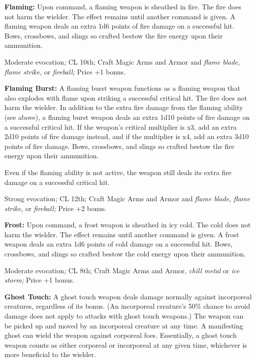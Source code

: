 \textbf{Flaming: }Upon command, a flaming weapon is sheathed in fire. The fire 
does not harm the wielder. The effect remains until another command is given. A 
flaming weapon deals an extra 1d6 points of fire damage on a successful hit. Bows, 
crossbows, and slings so crafted bestow the fire energy upon their ammunition.

Moderate evocation\textit{; }CL 10th; Craft Magic Arms and Armor and \textit{flame 
blade, flame strike, }or \textit{fireball; }Price +1 bonus.

\textbf{Flaming Burst: }A flaming burst weapon functions as a flaming weapon that 
also explodes with flame upon striking a successful critical hit. The fire does 
not harm the wielder. In addition to the extra fire damage from the flaming ability 
(see above), a flaming burst weapon deals an extra 1d10 points of fire damage on 
a successful critical hit. If the weapon's critical multiplier is x3, add an extra 
2d10 points of fire damage instead, and if the multiplier is x4, add an extra 3d10 
points of fire damage. Bows, crossbows, and slings so crafted bestow the fire energy 
upon their ammunition.

Even if the flaming ability is not active, the weapon still deals its extra fire 
damage on a successful critical hit.

Strong evocation\textit{; }CL 12th; Craft Magic Arms and Armor and \textit{flame 
blade, flame strike, }or \textit{fireball; }Price +2 bonus.

\textbf{Frost:} Upon command, a frost weapon is sheathed in icy cold. The cold 
does not harm the wielder. The effect remains until another command is given. A 
frost weapon deals an extra 1d6 points of cold damage on a successful hit. Bows, 
crossbows, and slings so crafted bestow the cold energy upon their ammunition.

Moderate evocation\textit{; }CL 8th; Craft Magic Arms and Armor, \textit{chill 
metal }or \textit{ice storm; }Price +1 bonus.

\textbf{Ghost Touch:} A ghost touch weapon deals damage normally against incorporeal 
creatures, regardless of its bonus. (An incorporeal creature's 50\% chance to avoid 
damage does not apply to attacks with ghost touch weapons.) The weapon can be picked 
up and moved by an incorporeal creature at any time. A manifesting ghost can wield 
the weapon against corporeal foes. Essentially, a ghost touch weapon counts as 
either corporeal or incorporeal at any given time, whichever is more beneficial 
to the wielder.


